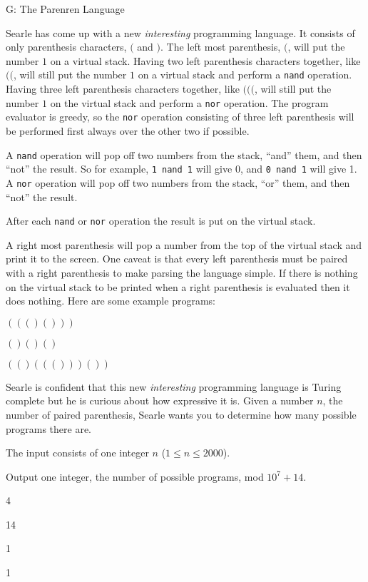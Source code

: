 \begin{problem}{G: The Parenren Language}

Searle has come up with a new \textit{interesting} programming language.
It consists of only parenthesis characters, $($ and $)$.
The left most parenthesis, $($, will put the number $1$ on a virtual stack.
Having two left parenthesis characters together, like $(($, will still put the number $1$ on a virtual stack and perform a \texttt{nand} operation.
Having three left parenthesis characters together, like $((($, will still put the number $1$ on the virtual stack and perform a \texttt{nor} operation.
The program evaluator is greedy, so the \texttt{nor} operation consisting of three left parenthesis will be performed first always over the other two if possible.

A \texttt{nand} operation will pop off two numbers from the stack, ``and'' them, and then ``not'' the result.
So for example, \texttt{1 nand 1} will give 0, and \texttt{0 nand 1} will give 1.
A \texttt{nor} operation will pop off two numbers from the stack, ``or'' them, and then ``not'' the result.

After each \texttt{nand} or \texttt{nor} operation the result is put on the virtual stack.

A right most parenthesis will pop a number from the top of the virtual stack and print it to the screen.
One caveat is that every left parenthesis must be paired with a right parenthesis to make parsing the language simple.
If there is nothing on the virtual stack to be printed when a right parenthesis is evaluated then it does nothing.
Here are some example programs:

$((()()))$

$()()()$

$(()((()))())$

Searle is confident that this new \textit{interesting} programming language is Turing complete but he is curious about how expressive it is.
Given a number $n$, the number of paired parenthesis, Searle wants you to determine how many possible programs there are.
\end{problem}

\begin{formalin}
The input consists of one integer $n$ ($1 \leq n \leq 2000$).
\end{formalin}

\begin{formalout}
Output one integer, the number of possible programs, mod $10^7 + 14$.
\end{formalout}

\begin{datain}
4
\end{datain}
\begin{dataout}
14
\end{dataout}

\begin{datain}
1
\end{datain}
\begin{dataout}
1
\end{dataout}
